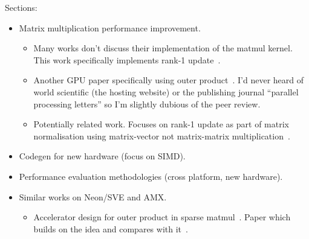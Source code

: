 \documentclass[\main/thesis.tex]{subfiles}
\begin{document}
Sections:
\begin{itemize}
  \item Matrix multiplication performance improvement.
  \begin{itemize}
    \item
      Many works don't discuss their implementation of the matmul kernel.
      This work specifically implements rank-1 update~\autocite{nakasato2011fast}.
    \item
      Another GPU paper specifically using outer product~\autocite{wu2016achieving}.
      I'd never heard of world scientific (the hosting website) or the publishing journal ``parallel processing letters'' so I'm slightly dubious of the peer review.
    \item
      Potentially related work.
      Focuses on rank-1 update as part of matrix normalisation using matrix-vector not matrix-matrix multiplication~\autocite{yu2020toward}.
  \end{itemize}
  \item Codegen for new hardware (focus on SIMD).
  \item Performance evaluation methodologies (cross platform, new hardware).
  \item Similar works on Neon/SVE and AMX.
    \begin{itemize}
      \item
        Accelerator design for outer product in sparse matmul~\autocite{pal2018outerspace}.
        Paper which builds on the idea and compares with it~\autocite{srivastava2020matraptor}.
    \end{itemize}
\end{itemize}
\end{document}
